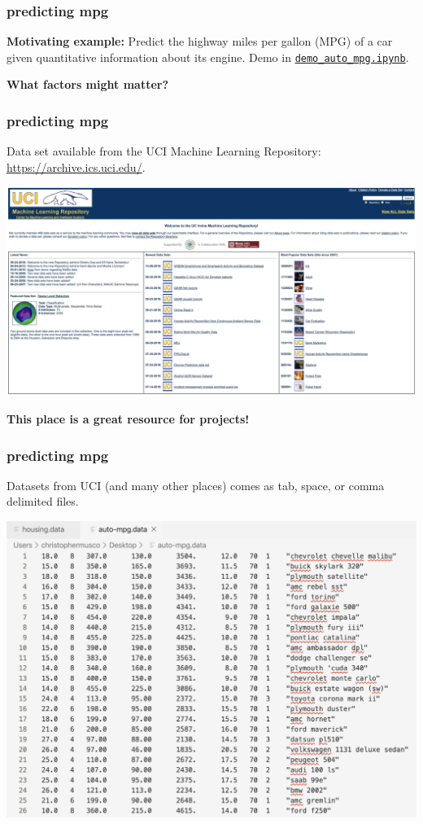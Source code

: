 \documentclass[handout,compress]{beamer}
\begin{document}
\begin{frame}
	\frametitle{predicting mpg}
	\textbf{Motivating example:} Predict the highway miles per gallon (MPG) of a car given quantitative information about its engine. Demo in
	\texttt{\href{https://github.com/cpmusco/introml/tree/master/simple_linear_regression}{demo\_auto\_mpg.ipynb}}.
	\vspace{4em}
	
	
	\textbf{What factors might matter?}
	\vspace{4em}
\end{frame}

\begin{frame}
	\frametitle{predicting mpg}
	Data set available from the UCI Machine Learning Repository: \href{https://archive.ics.uci.edu/}{https://archive.ics.uci.edu/}.
	\begin{center}
		\includegraphics[width=\textwidth]{uci_image.png}
		
		\vspace{1em}
		\alert{\textbf{This place is a great resource for projects!}}
	\end{center}
\end{frame}

\begin{frame}
		\frametitle{predicting mpg}
		Datasets from UCI (and many other places) comes as tab, space, or comma delimited files. 
			\begin{center}
			\includegraphics[width=.7\textwidth]{auto_data.png}
		\end{center}
\end{frame}
\end{document}
